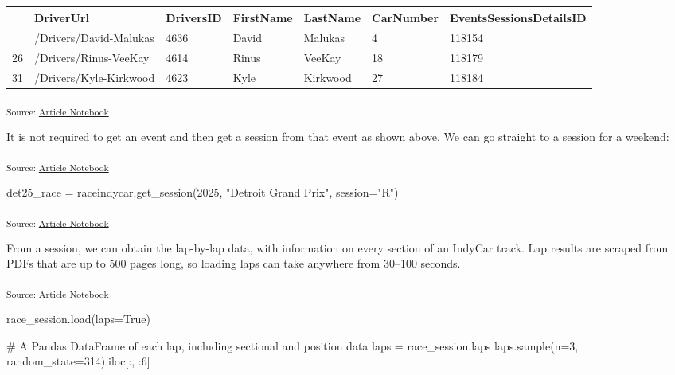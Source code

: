 \documentclass[
  10pt]{article}
\newenvironment{Shaded}{\begin{snugshade}}{\end{snugshade}}
\newcommand{\CommentTok}[1]{\textcolor[rgb]{0.37,0.37,0.37}{#1}}
\newcommand{\DecValTok}[1]{\textcolor[rgb]{0.68,0.00,0.00}{#1}}
\newcommand{\NormalTok}[1]{\textcolor[rgb]{0.00,0.23,0.31}{#1}}
\newcommand{\OperatorTok}[1]{\textcolor[rgb]{0.37,0.37,0.37}{#1}}
\newcommand{\StringTok}[1]{\textcolor[rgb]{0.13,0.47,0.30}{#1}}
\newcommand{\VariableTok}[1]{\textcolor[rgb]{0.07,0.07,0.07}{#1}}
\newcounter{none} %
\begin{document}
{\def\LTcaptype{none} %
\begin{longtable}[]{@{}lllllll@{}}
\toprule\noalign{}
& DriverUrl & DriversID & FirstName & LastName & CarNumber &
EventsSessionsDetailsID \\
\midrule\noalign{}
\endhead
\bottomrule\noalign{}
\endlastfoot
1 & /Drivers/David-Malukas & 4636 & David & Malukas & 4 & 118154 \\
26 & /Drivers/Rinus-VeeKay & 4614 & Rinus & VeeKay & 18 & 118179 \\
31 & /Drivers/Kyle-Kirkwood & 4623 & Kyle & Kirkwood & 27 & 118184 \\
\end{longtable}
}

\textsubscript{Source:
\href{https://ArchithSharma.github.io/raceindycar_manuscript/index.qmd.html}{Article
Notebook}}

It is not required to get an event and then get a session from that
event as shown above. We can go straight to a session for a weekend:

\textsubscript{Source:
\href{https://ArchithSharma.github.io/raceindycar_manuscript/index.qmd.html}{Article
Notebook}}

\begin{Shaded}
\begin{Highlighting}[]
\NormalTok{det25\_race }\OperatorTok{=}\NormalTok{ raceindycar.get\_session(}\DecValTok{2025}\NormalTok{, }\StringTok{"Detroit Grand Prix"}\NormalTok{, session}\OperatorTok{=}\StringTok{"R"}\NormalTok{)}
\end{Highlighting}
\end{Shaded}

\textsubscript{Source:
\href{https://ArchithSharma.github.io/raceindycar_manuscript/index.qmd.html}{Article
Notebook}}

From a session, we can obtain the lap-by-lap data, with information on
every section of an IndyCar track. Lap results are scraped from PDFs
that are up to 500 pages long, so loading laps can take anywhere from
30--100 seconds.

\textsubscript{Source:
\href{https://ArchithSharma.github.io/raceindycar_manuscript/index.qmd.html}{Article
Notebook}}

\begin{Shaded}
\begin{Highlighting}[]
\NormalTok{race\_session.load(laps}\OperatorTok{=}\VariableTok{True}\NormalTok{)}

\CommentTok{\# A Pandas DataFrame of each lap, including sectional and position data}
\NormalTok{laps }\OperatorTok{=}\NormalTok{ race\_session.laps}
\NormalTok{laps.sample(n}\OperatorTok{=}\DecValTok{3}\NormalTok{, random\_state}\OperatorTok{=}\DecValTok{314}\NormalTok{).iloc[:, :}\DecValTok{6}\NormalTok{]}
\end{Highlighting}
\end{Shaded}
\end{document}
